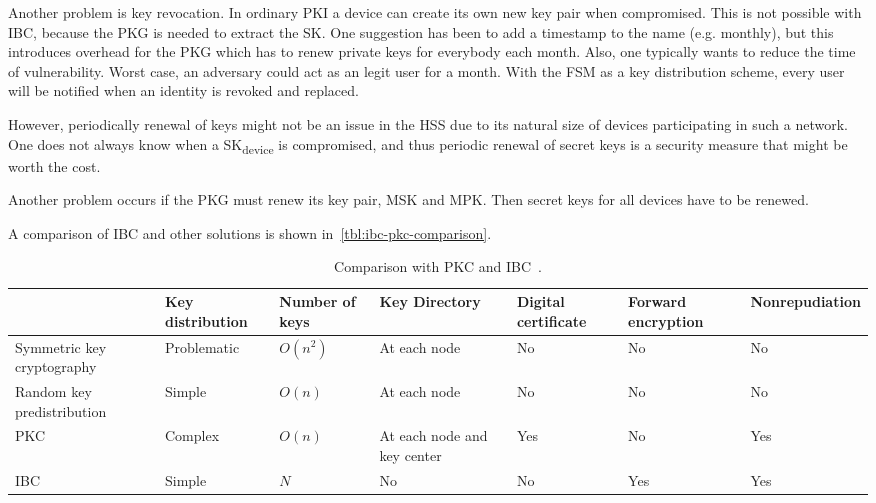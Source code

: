 Another problem is key revocation.
In ordinary \gls{PKI} a device can create its own new key pair when compromised. 
This is not possible with \gls{IBC}, because the \gls{PKG} is needed to extract the \gls{SK}.
One suggestion has been to add a timestamp to the \gls{name} (e.g. monthly), but this introduces overhead for the \gls{PKG} which has to renew private keys for everybody each month. 
Also, one typically wants to reduce the time of vulnerability. 
Worst case, an adversary could act as an legit user for a month.
With the \gls{FSM} as a key distribution scheme, every user will be notified when an identity is revoked and replaced.

However, periodically renewal of keys might not be an issue in the \gls{HSS} due to its natural size of devices participating in such a network.
One does not always know when a SK\textsubscript{device} is compromised, and thus periodic renewal of secret keys is a security measure that might be worth the cost.

Another problem occurs if the \gls{PKG} must renew its key pair, \gls{MSK} and \gls{MPK}.
Then secret keys for all devices have to be renewed.

A comparison of \gls{IBC} and other solutions is shown in~\autoref{tbl:ibc-pkc-comparison}.
\begin{table}[h]\footnotesize
  \begin{tabular}[c]{ | p{2cm} | p{1.5cm} | p{1cm} | p{1.2cm} | p{1cm} | p{1.3cm} | p{1.8cm} |}
  \hline 
  & Key distribution & Number of keys & Key Directory & Digital certificate & Forward encryption & Nonrepudiation  \\ \hline
  Symmetric key cryptography 	 & Problematic 	   & $O(n^2)$ 	& At each node 					        & No 	& No 	& No 	   \\ \hline 
  Random key predistribution 	 & Simple 		     & $O(n)$ 	  & At each node 					        & No 	& No 	& No 	   \\ \hline
  PKC 							           & Complex 		     & $O(n)$ 	  & At each node and key center 	& Yes & No 	& Yes 	 \\ \hline
  IBC 							           & Simple 		     & $N$ 		    & No 							              & No 	& Yes & Yes 	 \\ \hline
  \end{tabular}
  \caption[Comparison with PKC and IBC]{Comparison with PKC and IBC~\cite[Table 9.6]{Patil:2012:SWS:2464778}.}
  \label{tbl:ibc-pkc-comparison}
\end{table}

